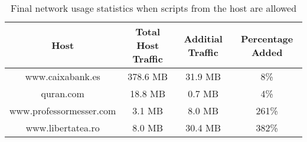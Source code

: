 \begin{table}
\begin{center}
\begin{tabular}{| c c c c |}
	\hline
	Host & Total Host Traffic & Additial Traffic & Percentage Added \\ \hline
	www.caixabank.es        & 378.6 MB & 31.9 MB &   8\% \\ \hline
	quran.com               &  18.8 MB &  0.7 MB &   4\% \\ \hline
	www.professormesser.com &   3.1 MB &  8.0 MB & 261\% \\ \hline
	www.libertatea.ro       &   8.0 MB & 30.4 MB & 382\% \\ \hline
\end{tabular}
\end{center}
\label{tab:percentageBypass}
	\caption{Final network usage statistics when scripts from the host are allowed}
\end{table}

